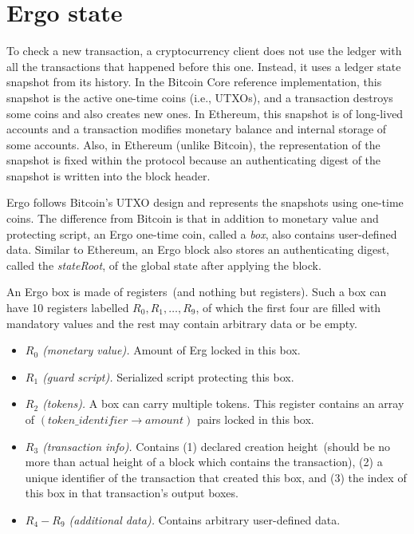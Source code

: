 \section{Ergo state}
\label{sec:utxo}

To check a new transaction, a cryptocurrency client does not use the ledger with all the transactions that happened before this
one. Instead, it uses a ledger state snapshot from its history. In the Bitcoin Core reference implementation, this snapshot is the active one-time coins (i.e., UTXOs), and a transaction destroys some coins and also creates new ones.
In Ethereum, this snapshot is of long-lived accounts and a transaction modifies monetary balance and internal storage of some accounts.  
Also, in Ethereum (unlike Bitcoin), the representation of the snapshot is fixed within the protocol because an authenticating digest of the snapshot is written into the block header. 

Ergo follows Bitcoin's UTXO design and represents the snapshots using one-time coins. The difference from Bitcoin is that in addition to monetary value and protecting script, an Ergo one-time coin, called a {\em box}, also contains user-defined data.
Similar to Ethereum, an Ergo block also stores an authenticating digest, called the {\em stateRoot}, of the global state after applying the block. 

An Ergo box is made of registers~(and nothing but registers). Such a box can have 10 registers labelled $R_0,R_1,\ldots,R_9$, of which the first four are filled with mandatory values and the rest may contain arbitrary data or be empty. 


\begin{itemize}
    \item{\em $R_0$ (monetary value). } Amount of Erg locked in this box.
    \item{\em $R_1$ (guard script). } Serialized script protecting this box.
    \item{\em $R_2$ (tokens). } A box can carry multiple tokens. This register contains an array of
    $(token\_identifier \rightarrow amount)$ pairs locked in this box.
    \item{\em $R_3$ (transaction info). } Contains (1) declared creation height~(should be no more than actual height of a block which contains the transaction),
    (2) a unique identifier of the transaction that created this box, and (3) the index of this box in that transaction's output boxes. 
    \item{\em $R_4-R_9$ (additional data). } Contains arbitrary user-defined data.
\end{itemize}

